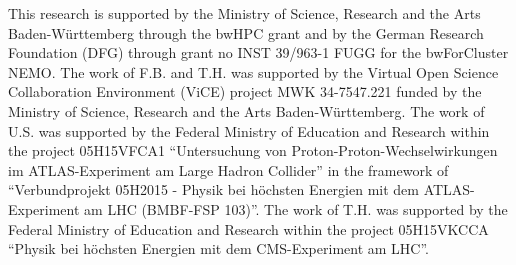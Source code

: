 
%
%


\begin{acknowledgements}
This research is supported by the Ministry of Science, Research and the Arts Baden-W\"urttemberg through the bwHPC grant
and by the German Research Foundation (DFG) through grant no INST
39/963-1 FUGG for the bwForCluster NEMO.
The work of F.B. and T.H. was supported by the Virtual Open Science
Collaboration Environment (ViCE) project MWK 34-7547.221 funded by the
Ministry of Science, Research and the Arts Baden-W\"urttemberg.
The work of U.S. was supported by  the Federal Ministry of Education
and Research within the project
05H15VFCA1 ``Untersuchung von Proton-Proton-Wechselwirkungen im
ATLAS-Experiment am Large Hadron Collider'' in the framework of ``Verbundprojekt 05H2015 - Physik bei h\"ochsten Energien mit dem ATLAS-Experiment am LHC (BMBF-FSP 103)''.
The work of T.H. was supported by the Federal Ministry of Education
and Research within the project 05H15VKCCA ``Physik bei h\"ochsten Energien mit dem CMS-Experiment
    am LHC''.
\end{acknowledgements}

